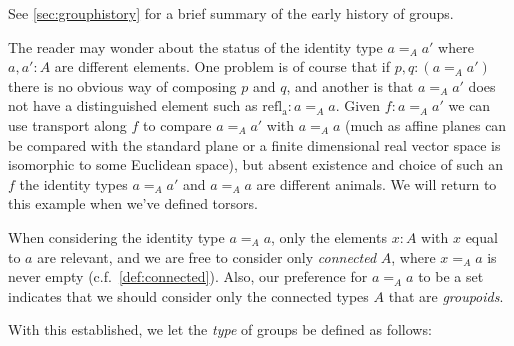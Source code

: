 See \cref{sec:grouphistory} for a brief summary of the early history of groups.
\begin{remark}
  The reader may wonder about the status of the identity type $a=_Aa'$ where $a,a':A$ are different elements.  One problem is of course that if $p,q:(a=_Aa')$ there is no obvious way of composing $p$ and $q$, and another is that $a=_Aa'$ does not have a distinguished element such as $\mathrm{refl{}_a}:a=_Aa$.
Given $f:a=_Aa'$ we can use transport along $f$ to compare $a=_Aa'$ with $a=_Aa$ (much as affine planes can be compared with the standard plane or a finite dimensional real vector space is isomorphic to some Euclidean space), but absent existence and choice of such an $f$ the identity types $a=_Aa'$ and $a=_Aa$ are different animals.  We will return to this example when we've defined torsors.
\end{remark}


\begin{remark}
  When considering the identity type $a=_Aa$, only the elements $x:A$ with $x$ equal to $a$ are relevant, and we are free to consider only \emph{connected} $A$, \ie where $x=_Aa$ is never empty (c.f.~\cref{def:connected}).  Also, our preference for $a=_Aa$ to be a set indicates that we should consider only the connected types $A$ that are \emph{groupoids}.
\end{remark}


With this established, we let the \emph{type} of groups be defined as follows:

